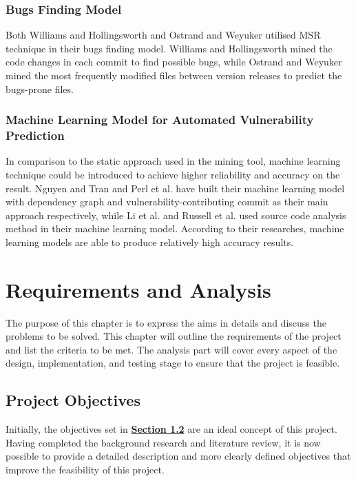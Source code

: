 \documentclass[12pt, a4paper]{report}
\begin{document}
\subsection{Bugs Finding Model}
Both Williams and Hollingsworth \cite{williams_2005} and Ostrand and Weyuker \cite{ostrand_2004}
utilised MSR technique in their bugs finding model. Williams and Hollingsworth mined the code
changes in each commit to find possible bugs, while Ostrand and Weyuker mined the most frequently
modified files between version releases to predict the bugs-prone files.

\subsection{Machine Learning Model for Automated Vulnerability Prediction}
In comparison to the static approach used in the mining tool, machine learning technique could be
introduced to achieve higher reliability and accuracy on the result. Nguyen and Tran
\cite{nguyen_2010} and Perl et al. \cite{perl_2015} have built their machine learning model with
dependency graph and vulnerability-contributing commit as their main approach respectively, while Li
et al. \cite{li_2016} and Russell et al. \cite{russell_2018} used source code analysis method in
their machine learning model. According to their researches, machine learning models are able to
produce relatively high accuracy results.

\chapter{Requirements and Analysis}
The purpose of this chapter is to express the aims in details and discuss the problems to be solved.
This chapter will outline the requirements of the project and list the criteria to be met. The
analysis part will cover every aspect of the design, implementation, and testing stage to ensure
that the project is feasible.

\section{Project Objectives}
Initially, the objectives set in \hyperref[sec:objectives]{\textbf{Section 1.2}} are an ideal
concept of this project. Having completed the background research and literature review, it is now
possible to provide a detailed description and more clearly defined objectives that improve the
feasibility of this project.
\end{document}
